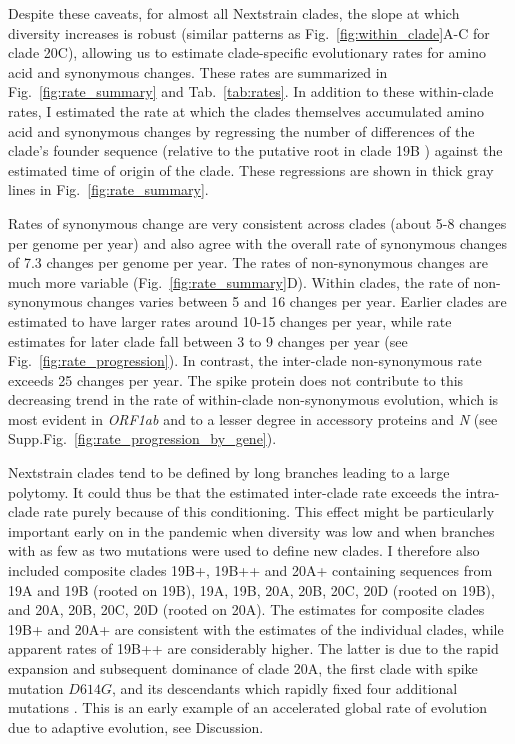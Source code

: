 \documentclass[aps,rmp, twocolumn]{revtex4}
\begin{document}
Despite these caveats, for almost all Nextstrain clades, the slope at which diversity increases is robust (similar patterns as Fig.~\ref{fig:within_clade}A-C for clade 20C), allowing us to estimate clade-specific evolutionary rates for amino acid and synonymous changes.
These rates are summarized in Fig.~\ref{fig:rate_summary} and Tab.~\ref{tab:rates}.
In addition to these within-clade rates, I estimated the rate at which the clades themselves accumulated amino acid and synonymous changes by regressing the number of differences of the clade's founder sequence (relative to the putative root in clade 19B \citep{caraballo-ortiz_tophap_2022}) against the estimated time of origin of the clade.
These regressions are shown in thick gray lines in Fig.~\ref{fig:rate_summary}.

Rates of synonymous change are very consistent across clades (about 5-8 changes per genome per year) and also agree with the overall rate of synonymous changes of 7.3 changes per genome per year.
The rates of non-synonymous changes are much more variable (Fig.~\ref{fig:rate_summary}D).
Within clades, the rate of non-synonymous changes varies between 5 and 16 changes per year.
Earlier clades are estimated to have larger rates around 10-15 changes per year, while rate estimates for later clade fall  between 3 to 9 changes per year (see Fig.~\ref{fig:rate_progression}).
In contrast, the inter-clade non-synonymous rate exceeds 25 changes per year.
The spike protein does not contribute to this decreasing trend in the rate of within-clade non-synonymous evolution, which is most evident in \emph{ORF1ab} and to a lesser degree in accessory proteins and \emph{N} (see Supp.Fig.~\ref{fig:rate_progression_by_gene}).

Nextstrain clades tend to be defined by long branches leading to a large polytomy.
It could thus be that the estimated inter-clade rate exceeds the intra-clade rate purely because of this conditioning.
This effect might be particularly important early on in the pandemic when diversity was low and when branches with as few as two mutations were used to define new clades.
I therefore also included composite clades 19B+, 19B++ and 20A+ containing sequences from 19A and 19B (rooted on 19B), 19A, 19B, 20A, 20B, 20C, 20D (rooted on 19B), and 20A, 20B, 20C, 20D (rooted on 20A).
The estimates for composite clades 19B+ and 20A+ are consistent with the estimates of the individual clades, while apparent rates of 19B++ are considerably higher.
The latter is due to the rapid expansion and subsequent dominance of clade 20A, the first clade with spike mutation $D614G$, and its descendants which rapidly fixed four additional mutations \citep{korber_tracking_2020}.
This is an early example of an accelerated global rate of evolution due to adaptive evolution, see Discussion.
\end{document}

